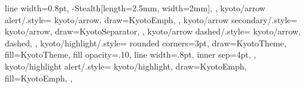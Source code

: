 {{    line width=0.8pt,
    -{Stealth[length=2.5mm, width=2mm]},
  },
  kyoto/arrow alert/.style={
    kyoto/arrow,
    draw=KyotoEmph,
  },
  kyoto/arrow secondary/.style={
    kyoto/arrow,
    draw=KyotoSeparator,
  },
  kyoto/arrow dashed/.style={
    kyoto/arrow,
    dashed,
  },
  kyoto/highlight/.style={
    rounded corners=3pt,
    draw=KyotoTheme,
    fill=KyotoTheme,
    fill opacity=.10,
    line width=.8pt,
    inner sep=4pt,
  },
  kyoto/highlight alert/.style={
    kyoto/highlight,
    draw=KyotoEmph,
    fill=KyotoEmph,
  },
}

\endinput
